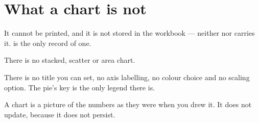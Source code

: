 \section{What a chart is not}

\begin{ccsteps}
\item It cannot be printed, and it is not stored in the workbook --- neither
 nor  carries it.  is the only record
of one.
\item There is no stacked, scatter or area chart.
\item There is no title you can set, no axis labelling, no colour choice and no
scaling option. The pie's key is the only legend there is.
\item A chart is a picture of the numbers as they were when you drew it. It does
not update, because it does not persist.
\end{ccsteps}
